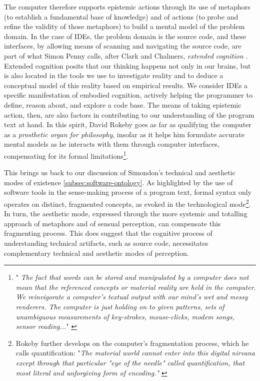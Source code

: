 The computer therefore supports epistemic actions through its use of metaphors (to establish a fundamental base of knowledge) and of actions (to probe and refine the validity of those metaphors) to build a mental model of the problem domain. In the case of IDEs, the problem domain is the source code, and these interfaces, by allowing means of scanning and navigating the source code, are part of what Simon Penny calls, after Clark and Chalmers, \emph{extended cognition} \citep{penny_making_2019}. Extended cognition posits that our thinking happens not only in our brains, but is also located in the tools we use to investigate reality and to deduce a conceptual model of this reality based on empirical results. We consider IDEs a specific manifestation of embodied cognition, actively helping the programmer to define, reason about, and explore a code base. The means of taking epistemic action, then, are also factors in contributing to our understanding of the program text at hand. In this spirit, David Rokeby goes as far as qualifying the computer as a \emph{prosthetic organ for philosophy}, insofar as it helps him formulate accurate mental models as he interacts with them through computer interfaces, compensating for its formal limitations\footnote{"\emph{ The fact that words can be stored and manipulated by a computer does not mean that the referenced concepts or material reality are held in the computer. We reinvigorate a computer's textual output with our mind's wet and messy renderers. The computer is just holding on to given patterns, sets of unambiguous measurements of key-strokes, mouse-clicks, modem songs, sensor reading...}" \citep{rokeby_computer_2003}}.

This brings us back to our discussion of Simondon's technical and aesthetic modes of existence \ref{subsec:software-ontology}. As highlighted by the use of software tools in the sense-making process of a program text, formal syntax only operates on distinct, fragmented concepts, as evoked in the technological mode\footnote{Rokeby further develops on the computer's fragmentation process, which he calls quantification: "\emph{The material world cannot enter into this digital nirvana except through that particular "eye of the needle" called quantification, that most literal and unforgiving form of encoding."} \citep{rokeby_computer_2003}}. In turn, the aesthetic mode, expressed through the more systemic and totalling approach of metaphors and of sensual perception, can compensate this fragmenting process. This does suggest that the cognitive process of understanding technical artifacts, such as source code, necessitates complementary technical and aesthetic modes of perception.

